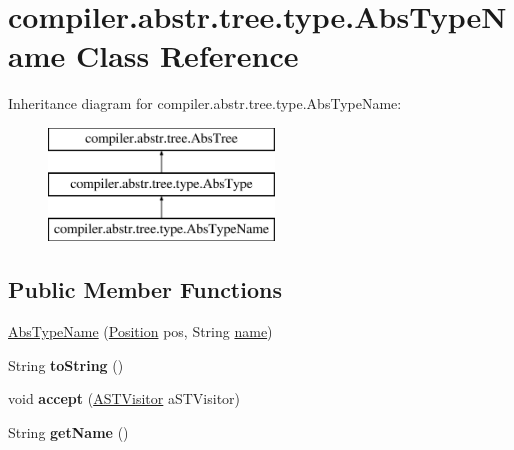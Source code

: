 \hypertarget{classcompiler_1_1abstr_1_1tree_1_1type_1_1_abs_type_name}{}\section{compiler.\+abstr.\+tree.\+type.\+Abs\+Type\+Name Class Reference}
\label{classcompiler_1_1abstr_1_1tree_1_1type_1_1_abs_type_name}
Inheritance diagram for compiler.\+abstr.\+tree.\+type.\+Abs\+Type\+Name\+:\begin{figure}[H]
\begin{center}
\leavevmode
\includegraphics[height=3.000000cm]{classcompiler_1_1abstr_1_1tree_1_1type_1_1_abs_type_name}
\end{center}
\end{figure}
\subsection*{Public Member Functions}
\begin{DoxyCompactItemize}
\item 
\hyperlink{classcompiler_1_1abstr_1_1tree_1_1type_1_1_abs_type_name_a38f4c0c37de6e29bcfe47266025d2b4b}{Abs\+Type\+Name} (\hyperlink{classcompiler_1_1_position}{Position} pos, String \hyperlink{classcompiler_1_1abstr_1_1tree_1_1type_1_1_abs_type_name_a41a111c2c38fc5178c2160497a7bb017}{name})
\item 
\mbox{\label{classcompiler_1_1abstr_1_1tree_1_1type_1_1_abs_type_name_a348cc77bbbdef2353f21116c6e38a001}} 
String {\bfseries to\+String} ()
\item 
\mbox{\label{classcompiler_1_1abstr_1_1tree_1_1type_1_1_abs_type_name_a8877f1b59a3697d03836a45069e93700}} 
void {\bfseries accept} (\hyperlink{interfacecompiler_1_1abstr_1_1_a_s_t_visitor}{A\+S\+T\+Visitor} a\+S\+T\+Visitor)
\item 
\mbox{\label{classcompiler_1_1abstr_1_1tree_1_1type_1_1_abs_type_name_a1586a5b665d7d394758e7386aee5f37a}} 
String {\bfseries get\+Name} ()
\end{DoxyCompactItemize}
